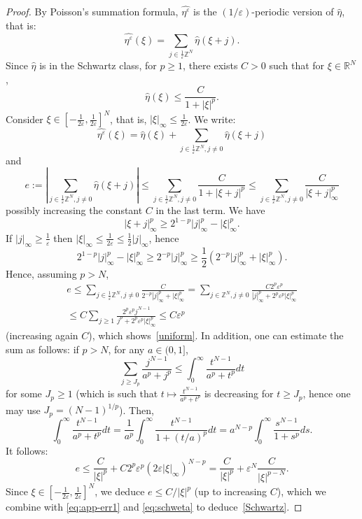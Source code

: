 \documentclass[10pt]{amsart}
\theoremstyle{plain}
\theoremstyle{definition}
\newcommand{\R}{\mathbb{R}}
\newcommand{\Z}{\mathbb{Z}}
\newcommand{\e}{\varepsilon}
\numberwithin{equation}{section}
\begin{document}
\begin{proof}
   By Poisson's summation formula, $\widehat{\eta^\e}$ is the $(1/\e)$-periodic version of $\widehat{\eta}$,
   that is:
   \[
     \widehat{\eta^\e}(\xi) = \sum_{j\in \frac{1}{\e}\Z^N} \widehat{\eta}(\xi+j).
   \]
   Since $\widehat{\eta}$ is in the Schwartz class,
   for $p\ge 1$, there exists $C  {>0}$ such that for $\xi\in\R^N$,
   \begin{equation} \label{eq:schweta}
     \widehat{\eta}(\xi)\le \frac{C}{1+|\xi|^p}.
   \end{equation}
   Consider $\xi \in [-\frac{1}{2\e},\frac{1}{2\e}]^N$, that is, $|\xi|_\infty\le \frac{1}{2\e}$.
   We write:
   \[
     \widehat{\eta^\e}(\xi) = \widehat{\eta}(\xi)+ \sum_{j\in \frac{1}{\e}\Z^N, j\neq 0} \widehat{\eta}(\xi+j)
   \]
   and
   \[
     e:=\left|\sum_{j\in \frac{1}{\e}\Z^N, j\neq 0} \widehat{\eta}(\xi+j)\right|
     \le \sum_{j\in \frac{1}{\e}\Z^N, j\neq 0} \frac{C}{1+|\xi+j|^p} \le
     \sum_{j\in \frac{1}{\e}\Z^N, j\neq 0} \frac{C}{|\xi+j|_\infty^p} 
   \]
   possibly increasing the constant $C$ in the last term. We have
   \[
     |\xi+j|_\infty^p \ge 2^{1-p}|j|_\infty^p - |\xi|_\infty^p.
   \]
   If  $|j|_\infty\ge \frac{1}{\e}$ then  $|\xi|_\infty\le \frac{1}{2\e}\le \frac{1}{2}|j|_\infty$,
   hence
   \[
     2^{1-p}|j|_\infty^p - |\xi|_\infty^p\ge 2^{-p}|j|_\infty^p \ge \frac{1}{2} (2^{-p}|j|_\infty^p + |\xi|_\infty^p).
     \]
   Hence, assuming $p>N$,
   \begin{equation}\label{eq:app-err1}
   \begin{split}
       e \le \sum_{j\in \frac{1}{\e}\Z^N, j\neq 0} \frac{C}{2^{-p}|j|_\infty^p+|\xi|_\infty^p}
     =  \sum_{j\in \Z^N, j\neq 0} \frac{C2^p\e^p}{|j|_\infty^p+2^p\e^p|\xi|_\infty^p} \\
      \le
     C\sum_{j\ge 1}   \frac{2^p\e^p j^{N-1}}{j^p+2^p\e^p|\xi|_\infty^p}   \le C\e^p
   \end{split}
   \end{equation}
   (increasing again $C$), which shows~\eqref{uniform}.
In addition,
   one can estimate the sum as follows: if $p>N$, for any $a\in (0,1]$,
   \[
     \sum_{j\ge J_p} \frac{j^{N-1}}{a^p+j^p} \le \int_0^\infty \frac{t^{N-1}}{a^p+t^p}dt
   \]
   for some $J_p\ge 1$ (which is such that $t\mapsto \frac{t^{N-1}}{a^p+t^p}$ is
   decreasing for $t\ge J_p$, hence one may use $J_p=(N-1)^{1/p}$). 
   Then,
   \[
     \int_0^\infty \frac{t^{N-1}}{a^p+t^p}dt = \frac{1}{a^p}\int_0^\infty \frac{t^{N-1}}{1+(t/a)^p}dt
      = a^{N-p} \int_0^\infty \frac{s^{N-1}}{1+s^p}ds.
   \]
   It follows:
   \begin{equation*}
     e\le \frac{C}{|\xi|^p} + C 2^p\e^p (2\e|\xi|_\infty)^{N-p} =
     \frac{C}{|\xi|^p} + \e^N\frac{C}{|\xi|^{p-N}}.
   \end{equation*}
     {Since $\xi\in[-\frac1{2\e},\frac1{2\e}]^N$, we deduce $e\le C/|\xi|^p$ (up to increasing $C$), which we combine with  \eqref{eq:app-err1} and \eqref{eq:schweta} to   deduce~\eqref{Schwartz}.}
 \end{proof}
\end{document}
